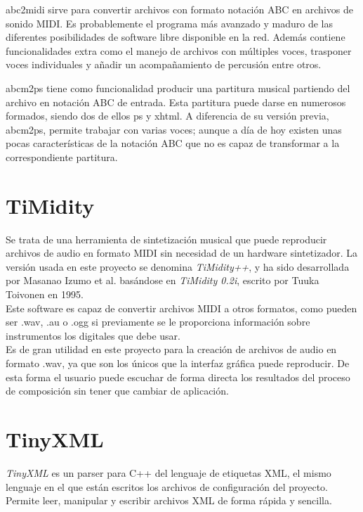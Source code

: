 abc2midi sirve para convertir archivos con formato notación ABC en archivos de sonido MIDI. Es probablemente el programa más avanzado y maduro de las diferentes posibilidades de software libre disponible en la red. Además contiene funcionalidades extra como el manejo de archivos con múltiples voces, trasponer voces individuales y añadir un acompañamiento de percusión entre otros.

abcm2ps tiene como funcionalidad producir una partitura musical partiendo del archivo en notación ABC de entrada. Esta partitura puede darse en numerosos formados, siendo dos de ellos ps y xhtml. A diferencia de su versión previa, abcm2ps, permite trabajar con varias voces; aunque a día de hoy existen unas pocas características de la notación ABC que no es capaz de transformar a la correspondiente partitura.

\section{TiMidity}
\label{sec:Timidity}

Se trata de una herramienta de sintetización musical que puede reproducir archivos de audio en formato MIDI sin necesidad de un hardware sintetizador. La versión usada en este proyecto se denomina \emph{TiMidity++}, y ha sido desarrollada por Masanao Izumo et al. basándose en \emph{TiMidity 0.2i}, escrito por Tuuka Toivonen en 1995.\\

Este software es capaz de convertir archivos MIDI a otros formatos, como pueden ser .wav, .au o .ogg si previamente se le proporciona información sobre instrumentos los digitales que debe usar.\\

Es de gran utilidad en este proyecto para la creación de archivos de audio en formato .wav, ya que son los únicos que la interfaz gráfica puede reproducir. De esta forma el usuario puede escuchar de forma directa los resultados del proceso de composición sin tener que cambiar de aplicación.

\section{TinyXML}
\label{sec:TinyXML}

\emph{TinyXML} es un parser para C++ del lenguaje de etiquetas XML, el mismo lenguaje en el que están escritos los archivos de configuración del proyecto. Permite leer, manipular y escribir archivos XML de forma rápida y sencilla.\\

